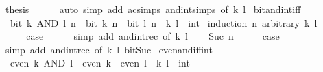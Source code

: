 \begin{isabellebody}
\ {\isacharquery}{\kern0pt}thesis\isanewline
\ \ \ \ \isamarkupfalse%
\ {\isacharparenleft}{\kern0pt}auto\ simp\ add{\isacharcolon}{\kern0pt}\ ac{\isacharunderscore}{\kern0pt}simps\ and{\isacharunderscore}{\kern0pt}int{\isachardot}{\kern0pt}simps\ {\isacharbrackleft}{\kern0pt}of\ k\ l{\isacharbrackright}{\kern0pt}{\isacharparenright}{\kern0pt}\isanewline
{}\isamarkupfalse%
%
\endisatagproof
{\isafoldproof}%
%
\isadelimproof
\isanewline
%
\endisadelimproof
\isanewline
{}\isamarkupfalse%
\ bit{\isacharunderscore}{\kern0pt}and{\isacharunderscore}{\kern0pt}int{\isacharunderscore}{\kern0pt}iff{\isacharcolon}{\kern0pt}\isanewline
\ \ {\isacartoucheopen}bit\ {\isacharparenleft}{\kern0pt}k\ AND\ l{\isacharparenright}{\kern0pt}\ n\ {\isasymlongleftrightarrow}\ bit\ k\ n\ {\isasymand}\ bit\ l\ n{\isacartoucheclose}\ \ k\ l\ {\isacharcolon}{\kern0pt}{\isacharcolon}{\kern0pt}\ int\isanewline
%
\isadelimproof
%
\endisadelimproof
%
\isatagproof
{}\isamarkupfalse%
\ {\isacharparenleft}{\kern0pt}induction\ n\ arbitrary{\isacharcolon}{\kern0pt}\ k\ l{\isacharparenright}{\kern0pt}\isanewline
\ \ \isamarkupfalse%
\ {}\isanewline
\ \ \isamarkupfalse%
\ \isamarkupfalse%
\ {\isacharquery}{\kern0pt}case\isanewline
\ \ \ \ \isamarkupfalse%
\ {\isacharparenleft}{\kern0pt}simp\ add{\isacharcolon}{\kern0pt}\ and{\isacharunderscore}{\kern0pt}int{\isacharunderscore}{\kern0pt}rec\ {\isacharbrackleft}{\kern0pt}of\ k\ l{\isacharbrackright}{\kern0pt}{\isacharparenright}{\kern0pt}\isanewline
{}\isamarkupfalse%
\isanewline
\ \ \isamarkupfalse%
\ {\isacharparenleft}{\kern0pt}Suc\ n{\isacharparenright}{\kern0pt}\isanewline
\ \ \isamarkupfalse%
\ \isamarkupfalse%
\ {\isacharquery}{\kern0pt}case\isanewline
\ \ \ \ \isamarkupfalse%
\ {\isacharparenleft}{\kern0pt}simp\ add{\isacharcolon}{\kern0pt}\ and{\isacharunderscore}{\kern0pt}int{\isacharunderscore}{\kern0pt}rec\ {\isacharbrackleft}{\kern0pt}of\ k\ l{\isacharbrackright}{\kern0pt}\ bit{\isacharunderscore}{\kern0pt}Suc{\isacharparenright}{\kern0pt}\isanewline
{}\isamarkupfalse%
%
\endisatagproof
{\isafoldproof}%
%
\isadelimproof
\isanewline
%
\endisadelimproof
\isanewline
{}\isamarkupfalse%
\ even{\isacharunderscore}{\kern0pt}and{\isacharunderscore}{\kern0pt}iff{\isacharunderscore}{\kern0pt}int{\isacharcolon}{\kern0pt}\isanewline
\ \ {\isacartoucheopen}even\ {\isacharparenleft}{\kern0pt}k\ AND\ l{\isacharparenright}{\kern0pt}\ {\isasymlongleftrightarrow}\ even\ k\ {\isasymor}\ even\ l{\isacartoucheclose}\ \ k\ l\ {\isacharcolon}{\kern0pt}{\isacharcolon}{\kern0pt}\ int\isanewline

\end{isabellebody}

